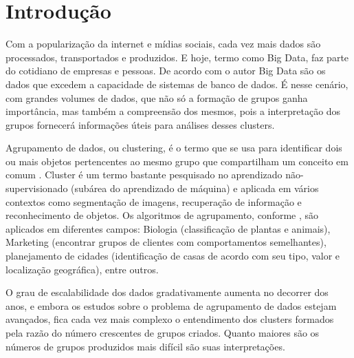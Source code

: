 

\chapter{Introdução} \label{cap:introd}

Com a popularização da internet e mídias sociais, cada vez mais dados são processados, transportados e produzidos. E hoje, termo como Big Data, faz parte do cotidiano de empresas e pessoas. De acordo com o autor  Big Data são os dados que excedem a capacidade de sistemas de banco de dados. É nesse cenário, com grandes volumes de dados, que não só a formação de grupos ganha importância, mas também a compreensão dos mesmos, pois a interpretação dos grupos fornecerá informações úteis para análises desses clusters.

Agrupamento de dados, ou clustering, é o termo que se usa para identificar dois ou mais objetos pertencentes ao mesmo grupo que compartilham um conceito em comum \cite{Kumar2013}. Cluster é um termo bastante pesquisado no aprendizado não-supervisionado (subárea do aprendizado de máquina) e  aplicada em vários contextos como segmentação de imagens, recuperação de informação e reconhecimento de objetos. Os algoritmos de agrupamento, conforme , são aplicados em diferentes campos: Biologia (classificação de plantas e animais), Marketing (encontrar grupos de clientes com comportamentos semelhantes), planejamento de cidades (identificação de casas de acordo com seu tipo, valor e localização geográfica), entre outros.

O grau de escalabilidade dos dados gradativamente aumenta no decorrer dos anos, e embora os estudos sobre o problema de agrupamento de dados estejam avançados, fica cada vez mais complexo o entendimento dos clusters formados pela razão do número crescentes de grupos criados. Quanto maiores são os números de grupos produzidos mais  difícil são suas interpretações. 

